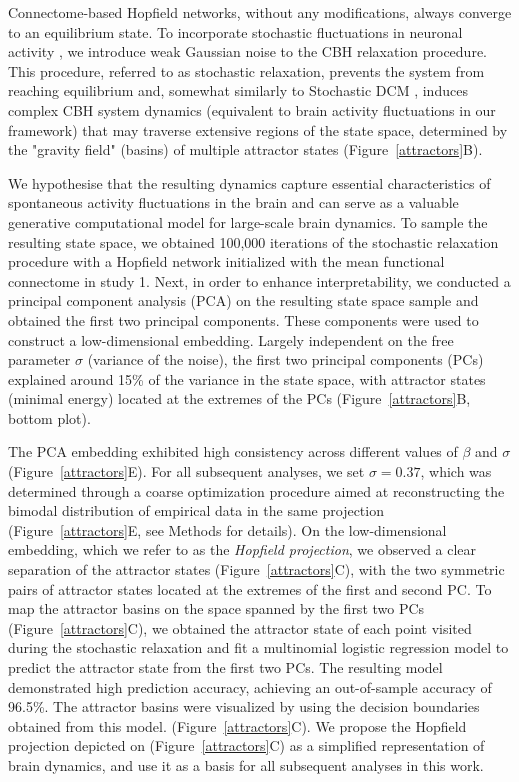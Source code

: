 \documentclass{article}
\begin{document}
Connectome-based Hopfield networks, without any modifications, always converge to an equilibrium state.
To incorporate stochastic fluctuations in neuronal activity \citep{robinson2005multiscale}, we introduce weak
Gaussian noise to the CBH relaxation procedure. This procedure, referred to as stochastic relaxation, prevents the
system from reaching equilibrium and, somewhat similarly to Stochastic DCM \citep{daunizeau2012stochastic}, induces
complex CBH system dynamics  (equivalent to brain activity fluctuations in our framework) that may traverse extensive
regions of the state space, determined by the "gravity field" (basins) of multiple attractor states (Figure~\ref{attractors}B).

We hypothesise that the resulting dynamics capture essential characteristics of spontaneous activity fluctuations in
the brain and can serve as a valuable generative computational model for large-scale brain dynamics. To sample the
resulting state space, we obtained 100,000 iterations of the stochastic relaxation procedure with a Hopfield network
initialized with the mean functional connectome in study 1. Next, in order to enhance interpretability, we conducted a
principal component analysis (PCA) on the resulting state space sample and obtained the first two principal components.
These components were used to construct a low-dimensional embedding. Largely independent on the free parameter $\sigma$
(variance of the noise), the first two principal components (PCs) explained around 15\% of the variance in the state
space, with attractor states (minimal energy) located at the extremes of the PCs (Figure~\ref{attractors}B, bottom plot).

The PCA embedding exhibited high consistency across different values of $\beta$ and $\sigma$ (Figure~\ref{attractors}E).
For all subsequent analyses, we set $\sigma=0.37$, which was determined through a coarse optimization procedure aimed
at reconstructing the bimodal distribution of empirical data in the same projection (Figure~\ref{attractors}E,
see Methods for details). On the low-dimensional embedding, which we refer to as the \textit{Hopfield projection}, we observed
a clear separation of the attractor states (Figure~\ref{attractors}C), with the two symmetric pairs of attractor states
located at the extremes of the first and second PC. To map the attractor basins on the space spanned by the first two
PCs (Figure~\ref{attractors}C), we obtained the attractor state of each point visited during the stochastic relaxation
and fit a multinomial logistic regression model to predict the attractor state from the first two PCs. The resulting
model demonstrated high prediction accuracy, achieving an out-of-sample accuracy of 96.5\%. The attractor basins were
visualized by using the decision boundaries obtained from this model. (Figure~\ref{attractors}C). We propose the Hopfield
projection depicted on (Figure~\ref{attractors}C) as a simplified representation of brain dynamics, and use it as a basis
for all subsequent analyses in this work.
\end{document}
